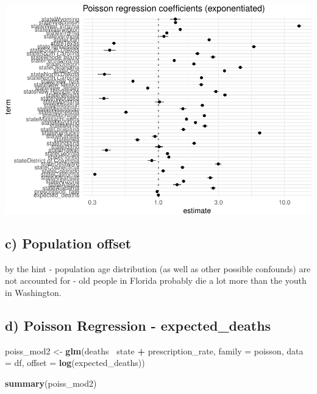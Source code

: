 \documentclass[]{article}
\newenvironment{Shaded}{\begin{snugshade}}{\end{snugshade}}
\newcommand{\DataTypeTok}[1]{\textcolor[rgb]{0.13,0.29,0.53}{#1}}
\newcommand{\KeywordTok}[1]{\textcolor[rgb]{0.13,0.29,0.53}{\textbf{#1}}}
\newcommand{\NormalTok}[1]{#1}
\newcommand{\OperatorTok}[1]{\textcolor[rgb]{0.81,0.36,0.00}{\textbf{#1}}}
\newcommand{\StringTok}[1]{\textcolor[rgb]{0.31,0.60,0.02}{#1}}
\begin{document}
\includegraphics{Assignment_1_files/figure-latex/visualizing poiss reg-1.pdf}

\hypertarget{c-population-offset}{%
\subsection{c) Population offset}\label{c-population-offset}}

by the hint - population age distribution (as well as other possible
confounds) are not accounted for - old people in Florida probably die a
lot more than the youth in Washington.

\hypertarget{d-poisson-regression---expected_deaths}{%
\subsection{d) Poisson Regression -
expected\_deaths}\label{d-poisson-regression---expected_deaths}}

\begin{Shaded}
\begin{Highlighting}[]
\NormalTok{poiss_mod2 <-}\StringTok{ }\KeywordTok{glm}\NormalTok{(deaths}\OperatorTok{~}\StringTok{ }\NormalTok{state }\OperatorTok{+}\StringTok{ }\NormalTok{prescription_rate, }\DataTypeTok{family =}\NormalTok{ poisson, }\DataTypeTok{data =}\NormalTok{ df, }\DataTypeTok{offset =} \KeywordTok{log}\NormalTok{(expected_deaths))}

\KeywordTok{summary}\NormalTok{(poiss_mod2)}
\end{Highlighting}
\end{Shaded}
\end{document}
